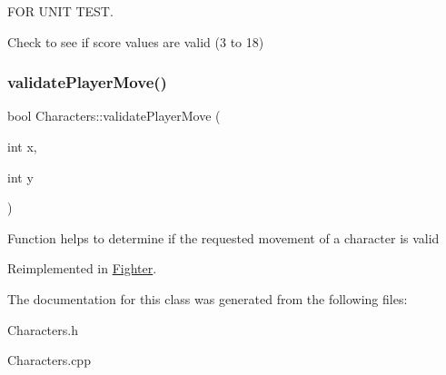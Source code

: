 F\+OR U\+N\+IT T\+E\+ST. 

Check to see if score values are valid (3 to 18) \hypertarget{class_characters_a42bbd977aed8772f446510e7fcfd577f}{}\label{class_characters_a42bbd977aed8772f446510e7fcfd577f} 
\subsubsection{\texorpdfstring{validate\+Player\+Move()}{validatePlayerMove()}}
{\footnotesize\ttfamily bool Characters\+::validate\+Player\+Move (\begin{DoxyParamCaption}\item[{int}]{x,  }\item[{int}]{y }\end{DoxyParamCaption})\hspace{0.3cm}{\ttfamily [virtual]}}

Function helps to determine if the requested movement of a character is valid 

Reimplemented in \hyperlink{class_fighter_ab2a750803d7df7f1d66e9b40074f7a41}{Fighter}.



The documentation for this class was generated from the following files\+:\begin{DoxyCompactItemize}
\item 
Characters.\+h\item 
Characters.\+cpp\end{DoxyCompactItemize}
